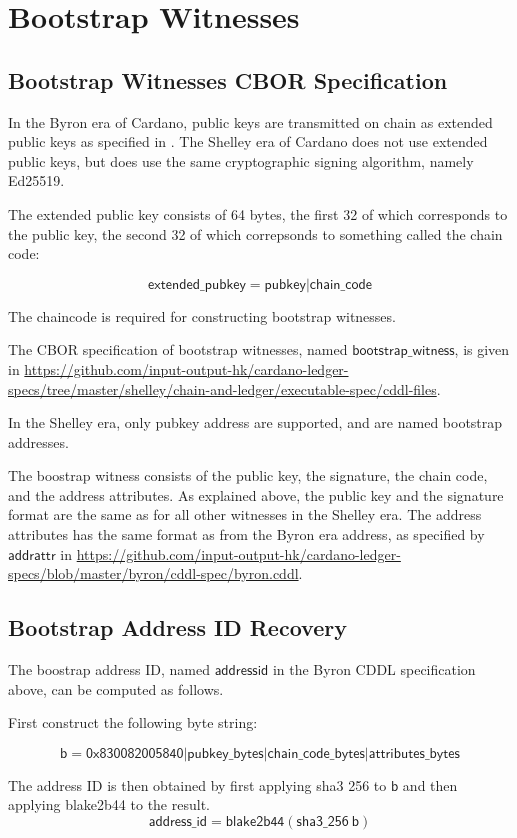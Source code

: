 \section{Bootstrap Witnesses}
\label{sec:bootstrap-witnesses}

\subsection{Bootstrap Witnesses CBOR Specification}

In the Byron era of Cardano, public keys are transmitted
on chain as extended public keys as specified in \cite{bip32}.
The Shelley era of Cardano does not use extended public keys,
but does use the same cryptographic signing algorithm,
namely Ed25519.

The extended public key consists of 64 bytes,
the first 32 of which corresponds to the public key,
the second 32 of which correpsonds to something called the chain code:

$$\mathsf{extended\_pubkey} = \mathsf{pubkey}|\mathsf{chain\_code}$$

The chaincode is required for constructing bootstrap witnesses.

The CBOR specification of bootstrap witnesses,
named $\mathsf{bootstrap\_witness}$,
is given in
\url{https://github.com/input-output-hk/cardano-ledger-specs/tree/master/shelley/chain-and-ledger/executable-spec/cddl-files}.

In the Shelley era, only pubkey address are supported,
and are named bootstrap addresses.

The boostrap witness consists of the public key, the signature,
the chain code, and the address attributes.
As explained above, the public key and the signature format
are the same as for all other witnesses in the Shelley era.
The address attributes has the same format as from the Byron era address,
as specified by $\mathsf{addrattr}$ in
\url{https://github.com/input-output-hk/cardano-ledger-specs/blob/master/byron/cddl-spec/byron.cddl}.


\subsection{Bootstrap Address ID Recovery}

The boostrap address ID, named $\mathsf{addressid}$ in the Byron CDDL
specification above, can be computed as follows.

First construct the following byte string:

$$\mathsf{b} =
  \mathsf{0x830082005840}
  | \mathsf{pubkey\_bytes}
  | \mathsf{chain\_code\_bytes}
  | \mathsf{attributes\_bytes}
$$

The address ID is then obtained by first applying
sha3 256 to $\mathsf{b}$ and then applying blake2b44 to the result.
$$\mathsf{address\_id} =
  \mathsf{blake2b44}(\mathsf{sha3\_256}~\mathsf{b})
$$
